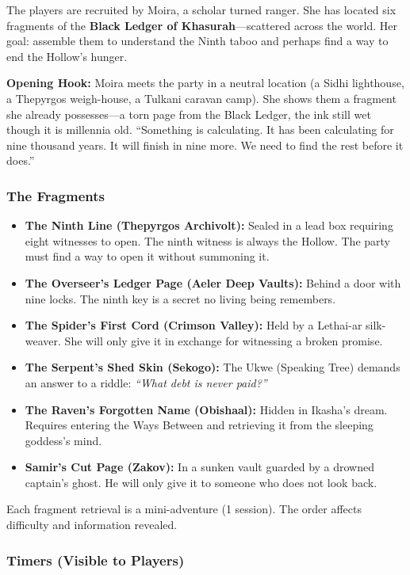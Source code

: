 \documentclass[11pt]{article}
\begin{document}
The players are recruited by Moira, a scholar turned ranger. She has located six fragments of the \textbf{Black Ledger of Khasurah}---scattered across the world. Her goal: assemble them to understand the Ninth taboo and perhaps find a way to end the Hollow's hunger.

\textbf{Opening Hook:} Moira meets the party in a neutral location (a Sidhi lighthouse, a Thepyrgos weigh-house, a Tulkani caravan camp). She shows them a fragment she already possesses---a torn page from the Black Ledger, the ink still wet though it is millennia old. ``Something is calculating. It has been calculating for nine thousand years. It will finish in nine more. We need to find the rest before it does.''

\subsubsection{The Fragments}

\begin{itemize}
    \item \textbf{The Ninth Line (Thepyrgos Archivolt):} Sealed in a lead box requiring eight witnesses to open. The ninth witness is always the Hollow. The party must find a way to open it without summoning it.
    \item \textbf{The Overseer's Ledger Page (Aeler Deep Vaults):} Behind a door with nine locks. The ninth key is a secret no living being remembers.
    \item \textbf{The Spider's First Cord (Crimson Valley):} Held by a Lethai-ar silk-weaver. She will only give it in exchange for witnessing a broken promise.
    \item \textbf{The Serpent's Shed Skin (Sekogo):} The Ukwe (Speaking Tree) demands an answer to a riddle: \textit{``What debt is never paid?''}
    \item \textbf{The Raven's Forgotten Name (Obishaal):} Hidden in Ikasha's dream. Requires entering the Ways Between and retrieving it from the sleeping goddess's mind.
    \item \textbf{Samir's Cut Page (Zakov):} In a sunken vault guarded by a drowned captain's ghost. He will only give it to someone who does not look back.
\end{itemize}

Each fragment retrieval is a mini-adventure (1 session). The order affects difficulty and information revealed.

\subsubsection{Timers (Visible to Players)}
\end{document}
